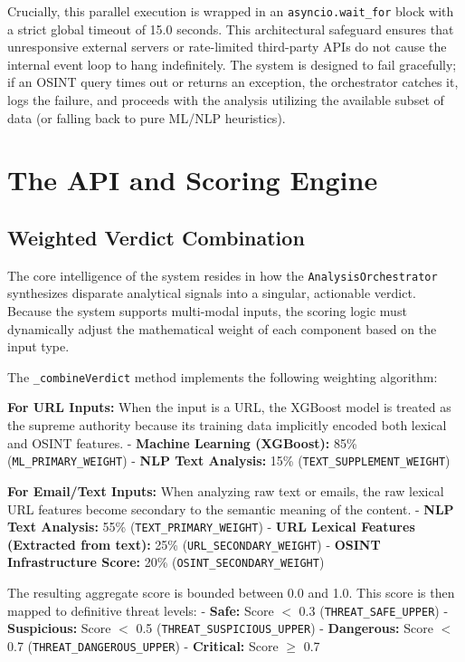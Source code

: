 Crucially, this parallel execution is wrapped in an
\texttt{asyncio.wait\_for} block with a strict global timeout of 15.0
seconds. This architectural safeguard ensures that unresponsive external
servers or rate-limited third-party APIs do not cause the internal event
loop to hang indefinitely. The system is designed to fail gracefully; if
an OSINT query times out or returns an exception, the orchestrator
catches it, logs the failure, and proceeds with the analysis utilizing
the available subset of data (or falling back to pure ML/NLP
heuristics).

\section{The API and Scoring
Engine}\label{the-api-and-scoring-engine}

\subsection{Weighted Verdict
Combination}\label{weighted-verdict-combination}

The core intelligence of the system resides in how the
\texttt{AnalysisOrchestrator} synthesizes disparate analytical signals
into a singular, actionable verdict. Because the system supports
multi-modal inputs, the scoring logic must dynamically adjust the
mathematical weight of each component based on the input type.

The \texttt{\_combineVerdict} method implements the following weighting
algorithm:

\textbf{For URL Inputs:} When the input is a URL, the XGBoost model is
treated as the supreme authority because its training data implicitly
encoded both lexical and OSINT features. - \textbf{Machine Learning
(XGBoost):} 85\% (\texttt{ML\_PRIMARY\_WEIGHT}) - \textbf{NLP Text
Analysis:} 15\% (\texttt{TEXT\_SUPPLEMENT\_WEIGHT})

\textbf{For Email/Text Inputs:} When analyzing raw text or emails, the
raw lexical URL features become secondary to the semantic meaning of the
content. - \textbf{NLP Text Analysis:} 55\%
(\texttt{TEXT\_PRIMARY\_WEIGHT}) - \textbf{URL Lexical Features
(Extracted from text):} 25\% (\texttt{URL\_SECONDARY\_WEIGHT}) -
\textbf{OSINT Infrastructure Score:} 20\%
(\texttt{OSINT\_SECONDARY\_WEIGHT})

The resulting aggregate score is bounded between 0.0 and 1.0. This score
is then mapped to definitive threat levels: - \textbf{Safe:} Score
$<${} 0.3 (\texttt{THREAT\_SAFE\_UPPER}) - \textbf{Suspicious:}
Score $<${} 0.5 (\texttt{THREAT\_SUSPICIOUS\_UPPER}) -
\textbf{Dangerous:} Score $<${} 0.7
(\texttt{THREAT\_DANGEROUS\_UPPER}) - \textbf{Critical:} Score \(\ge\)
0.7

